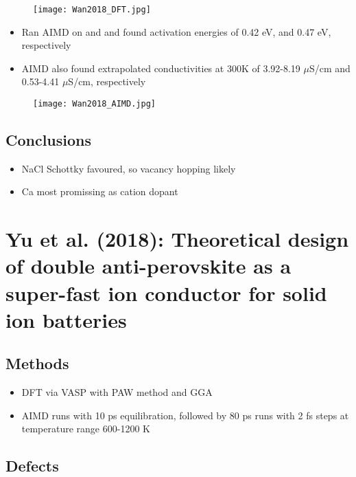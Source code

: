 \documentclass[10pt,a4paper, titlepage]{article}
\begin{document}
\begin{figure}[H]
\centering
\texttt{[image: Wan2018\_DFT.jpg]}
\end{figure}

\begin{itemize}
  \item Ran AIMD on  and  and found activation energies of 0.42 eV,  and 0.47 eV, respectively
  \item AIMD also found extrapolated conductivities at 300K of 3.92-8.19 $\mu$S/cm and 0.53-4.41 $\mu$S/cm, respectively
\end{itemize}

\begin{figure}[H]
\centering
\texttt{[image: Wan2018\_AIMD.jpg]}
\end{figure}

\subsection{Conclusions}

\begin{itemize}
  \item NaCl Schottky favoured, so vacancy hopping likely
  \item Ca most promissing as cation dopant
\end{itemize}

\section{Yu et al. (2018): Theoretical design of double anti-perovskite  as a super-fast ion conductor for solid  ion batteries}

\subsection{Methods}

\begin{itemize}
  \item DFT via VASP with PAW method and GGA
  \item AIMD runs with 10 ps equilibration, followed by 80 ps runs with 2 fs steps at temperature range 600-1200 K
\end{itemize}

\subsection{Defects}
\end{document}
